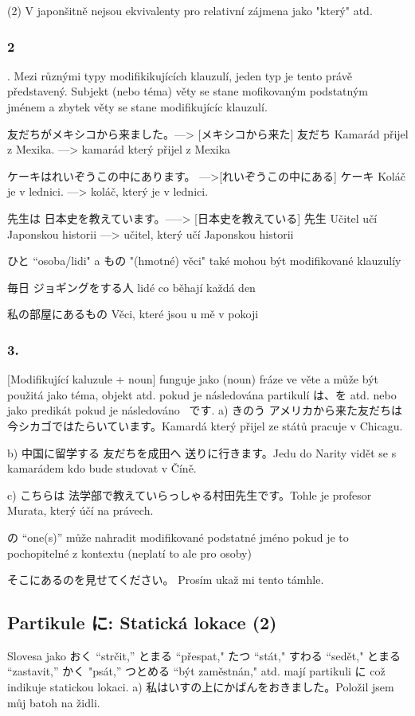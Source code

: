 (2) V japonšitně nejsou ekvivalenty pro relativní zájmena jako "který" atd. 

\subsubsection{2}.
Mezi různými typy modifikikujících klauzulí, jeden typ je tento právě představený. Subjekt (nebo téma) věty se stane mofikovaným podstatným jménem a zbytek věty se stane modifikujícíc klauzulí.

友だちがメキシコから来ました。---> [メキシコから来た] 友だち
Kamarád přijel z Mexika.  ––> kamarád který přijel z Mexika

ケーキはれいぞうこの中にあります。 ––>[れいぞうこの中にある] ケーキ
Koláč je v lednici. ––> koláč, který je v lednici.


先生は 日本史を教えています。–––> [日本史を教えている] 先生
Učitel učí Japonskou historii ––> učitel, který učí Japonskou historii



ひと “osoba/lidi" a もの "(hmotné) věci" také mohou být modifikované klauzulíy

毎日 ジョギングをする人 lidé co běhají každá den

私の部屋にあるもの Věci, které jsou u mě v pokoji


\subsubsection{3.}
 [Modifikující kaluzule + noun] funguje jako (noun) fráze ve věte a může být použitá jako téma, objekt atd. pokud je následována partikulí は、を atd. nebo jako predikát pokud je následováno  ~です.
a) きのう アメリカから来た友だちは今シカゴではたらいています。Kamardá který přijel ze států pracuje v Chicagu.


b) 中国に留学する 友だちを成田へ 送りに行きます。Jedu do Narity vidět se s kamarádem kdo bude studovat v Číně.

c) こちらは 法学部で教えていらっしゃる村田先生です。Tohle je profesor Murata, který účí na právech.

の “one(s)” může nahradit modifikované podstatné jméno pokud je to pochopitelné z kontextu (neplatí to ale pro osoby)

そこにあるのを見せてください。 Prosím ukaž mi tento támhle.



\subsection{Partikule に: Statická lokace (2)}
Slovesa jako  おく “strčit,” とまる “přespat," たつ “stát," すわる “sedět," とまる
“zastavit,” かく "psát,” つとめる “být zaměstnán," atd. mají partikuli に což indikuje statickou lokaci.
a) 私はいすの上にかばんをおきました。Položil jsem můj batoh na židli.


